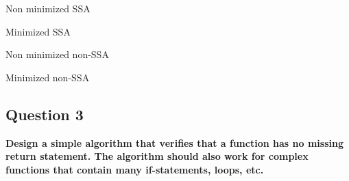     Non minimized SSA
    
    Minimized SSA
    
    Non minimized non-SSA
    
    Minimized non-SSA
    

\subsection{Question 3}
    \textbf{Design a simple algorithm that verifies that a function has no missing return statement. The algorithm should also work for complex functions that contain many if-statements, loops, etc.}

    

